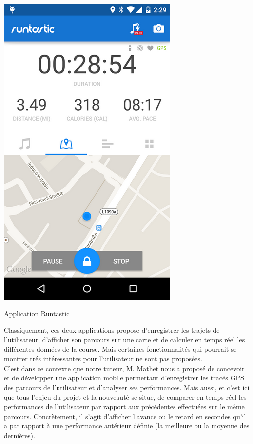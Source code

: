 \begin{multicols}{2}
\begin{img}
  \includegraphics{img/Runtastic.png}
  \caption{Application Runtastic}
\end{img}
\end{multicols}

Classiquement, ces deux applications propose d'enregistrer les trajets de l'utilisateur, d'afficher son parcours sur une carte et de calculer en temps réel les différentes données de la course. Mais certaines fonctionnalités qui pourrait se montrer trés intéressantes pour l'utilisateur ne sont pas proposées.\\

C'est dans ce contexte que notre tuteur, M. Mathet nous a proposé de concevoir et de développer une application mobile permettant d'enregistrer les tracés GPS des parcours de l'utilisateur et d'analyser ses performances. Mais aussi, et c'est ici que tous l'enjeu du projet et la nouveauté se situe, de comparer en temps réel les performances de l'utilisateur par rapport aux  précédentes effectuées sur le même parcours. Concrètement, il s'agit d'afficher l'avance ou le retard en secondes qu'il a par rapport à une performance antérieur définie (la meilleure ou la moyenne des dernières). 
